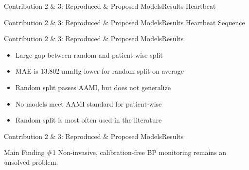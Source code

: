 \begin{frame}{Contribution 2 \& 3: Reproduced \& Proposed Models}{Results}
    \centering
    Heartbeat
    \begin{figure}
        
        \hfill
        
    \end{figure}
\end{frame}


\begin{frame}{Contribution 2 \& 3: Reproduced \& Proposed Models}{Results}
    \centering
    Heartbeat Sequence
    \begin{figure}
        
        \hfill
        
    \end{figure}
\end{frame}

\begin{frame}{Contribution 2 \& 3: Reproduced \& Proposed Models}{Results}
    \begin{itemize}
        \item Large gap between random and patient-wise split
        \item MAE is 13.802 mmHg lower for random split on average
        \item Random split passes AAMI, but does not generalize
        \item No models meet AAMI standard for patient-wise
        \item Random split is most often used in the literature
    \end{itemize}
\end{frame}

\begin{frame}{Contribution 2 \& 3: Reproduced \& Proposed Models}{Results}
    \begin{block}{Main Finding \#1}
        Non-invasive, calibration-free BP monitoring remains an unsolved problem.
    \end{block}
\end{frame}

